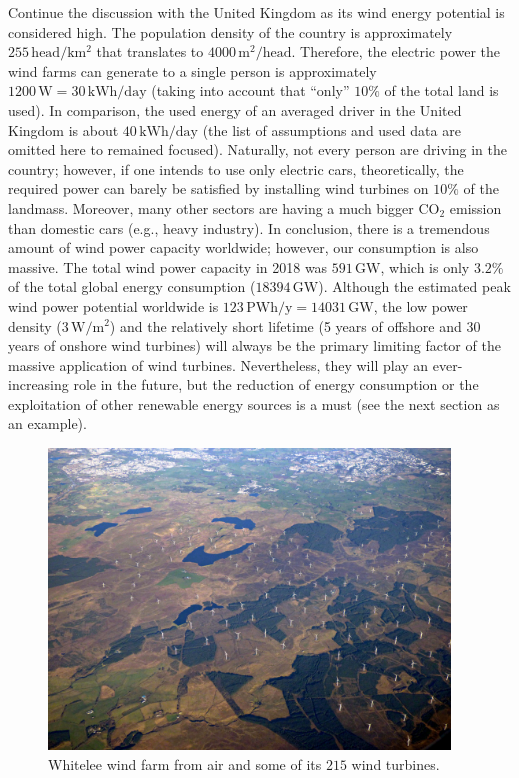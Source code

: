 Continue the discussion with the United Kingdom as its wind energy potential is considered high. The population density of the country is approximately $255\,\mathrm{head/km^2}$ that translates to $4000\,\mathrm{m^2/head}$. Therefore, the electric power the wind farms can generate to a single person is approximately $1200\,\mathrm{W}=30\,\mathrm{kWh/day}$ (taking into account that ``only'' $10\%$ of the total land is used). In comparison, the used energy of an averaged driver in the United Kingdom is about $40\,\mathrm{kWh/day}$ (the list of assumptions and used data are omitted here to remained focused). Naturally, not every person are driving in the country; however, if one intends to use only electric cars, theoretically, the required power can barely be satisfied by installing wind turbines on $10\%$ of the landmass. Moreover, many other sectors are having a much bigger $\mathrm{CO}_2$ emission than domestic cars (e.g., heavy industry). In conclusion, there is a tremendous amount of wind power capacity worldwide; however, our consumption is also massive. The total wind power capacity in 2018 was $591\,\mathrm{GW}$, which is only $3.2\%$ of the total global energy consumption ($18394\,\mathrm{GW}$). Although the estimated peak wind power potential worldwide is $123\,\mathrm{PWh/y}=14031\,\mathrm{GW}$, the low power density ($3\,\mathrm{W/m^2}$) and the relatively short lifetime (5 years of offshore and 30 years of onshore wind turbines) will always be the primary limiting factor of the massive application of wind turbines. Nevertheless, they will play an ever-increasing role in the future, but the reduction of energy consumption or the exploitation of other renewable energy sources is a must (see the next section as an example).

\begin{figure}[ht!]
	\centering
		\includegraphics[height=8cm]{HydroAndWindPower/Figures/Whitelee_wind_farm_from_the_air.jpg}
	\caption{Whitelee wind farm from air and some of its $215$ wind turbines.}
	\label{Fig:Whitelee_wind_farm}
\end{figure}



